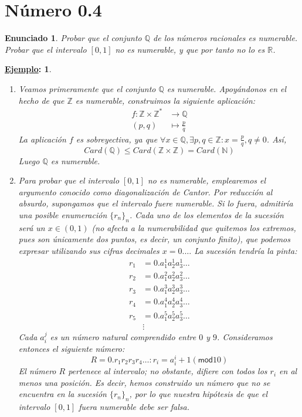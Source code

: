 \documentclass[10pt,a4paper,openright]{book}
\theoremstyle{break}
\newtheorem*{enun}{Enunciado}
\newtheorem*{ej}{\underline{Ejemplo}:}
\begin{document}
\section{Número 0.4}
\begin{enun}
Probar que el conjunto $\mathbb{Q}$ de los números racionales es numerable. Probar que el intervalo $[0,1]$ no es numerable, y que por tanto no lo es $\mathbb{R}$.
\end{enun}
\begin{ej}
\begin{enumerate}[label={(\arabic*)}]
\item Veamos primeramente que el conjunto $\mathbb{Q}$ es numerable. Apoyándonos en el hecho de que $\mathbb{Z}$ es numerable, construimos la siguiente aplicación: \begin{align*}
f: \mathbb{Z} \times \mathbb{Z}^* &\rightarrow \mathbb{Q} \\ 
(p,q) &\mapsto \frac{p}{q}
\end{align*}
La aplicación $f$ es sobreyectiva, ya que $\forall x \in \mathbb{Q}, \exists p,q \in \mathbb{Z} : x = \frac{p}{q}, q \neq 0$. Así, $$Card(\mathbb{Q}) \leq Card(\mathbb{Z} \times \mathbb{Z}) = Card(\mathbb{N})$$ Luego $\mathbb{Q}$ es numerable.
\item Para probar que el intervalo $[0,1]$ no es numerable, emplearemos el argumento conocido como \textit{diagonalización de Cantor}. Por reducción al absurdo, supongamos que el intervalo fuere numerable. Si lo fuera, admitiría una posible enumeración $\{r_n\}_n$. Cada uno de los elementos de la sucesión será un $x \in (0,1)$ (no afecta a la numerabilidad que quitemos los extremos, pues son únicamente dos puntos, es decir, un conjunto finito), que podemos expresar utilizando sus cifras decimales $x = 0.\ldots$ La sucesión tendría la pinta:
\begin{align*}
r_1 &= 0.a_1^1a_2^1a_3^1\ldots \\ 
r_2 &= 0.a_1^2a_2^2a_3^2\ldots \\ 
r_3 &= 0.a_1^3a_2^3a_3^3\ldots \\ 
r_4 &= 0.a_1^4a_2^4a_3^4\ldots \\ 
r_5 &= 0.a_1^5a_2^5a_3^5\ldots \\ 
&\vdots
\end{align*}
Cada $a_i^j$ es un número natural comprendido entre $0$ y $9$. Consideramos entonces el siguiente número: $$R= 0.r_1r_2r_3r_4 \ldots: r_i = a_i^i + 1 (\textsf{mod} 10)$$
El número $R$ pertenece al intervalo; no obstante, difiere con todos los $r_i$ en al menos una posición. Es decir, hemos construido un número que no se encuentra en la sucesión $\{r_n\}_n$, por lo que nuestra hipótesis de que el intervalo $[0,1]$ fuera numerable debe ser falsa.


\end{enumerate}
\end{ej}
\end{document}
